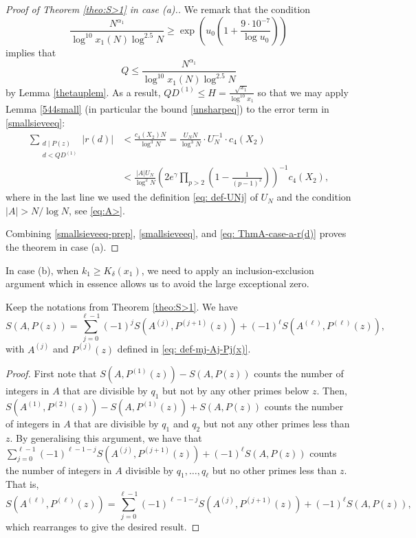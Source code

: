 \documentclass[12pt]{amsart}
\begin{document}
\begin{proof}[Proof of Theorem \ref{theo:S>1} in case (a).]
We remark that the condition 
\begin{equation*}
    \frac{N^{\alpha_1}}{\log^{10}x_1(N)\log^{2.5}N}\ge\exp\left(u_0\left(1+\frac{9\cdot 10^{-7}}{\log u_0}\right)\right)
\end{equation*}
implies that
\begin{equation}\label{qeq}
    Q\le \frac{N^{\alpha_1}}{\log^{10}x_1(N)\log^{2.5}N}
\end{equation}
by Lemma \ref{thetauplem}. As a result, $QD^{(1)}\le H=\frac{\sqrt{x_1}}{\log^{10}x_1}$ so that we may apply Lemma \ref{544small} (in particular the bound \eqref{unsharpeq}) to the error term in \eqref{smallsieveeq}:
\begin{align}
    \sum_{\substack{d\mid P(z)\\ d<QD^{(1)}}}|r(d)| &< \frac{c_4(X_2) N}{\log^3 N} = \frac{U_N N}{\log^3 N} \cdot U_N^{-1} \cdot c_4(X_2) \nonumber\\
    &< \frac{|A| U_N}{\log^2 N} \left(2e^{\gamma}\prod_{p>2}\left(1-\frac{1}{(p-1)^2}\right)\right)^{-1} c_4(X_2), \label{eq: ThmA-case-a-r(d)}
\end{align}
where in the last line we used the definition \eqref{eq: def-UNj} of $U_N$ and the condition $|A|>N/\log N$, see \eqref{eq:A>}. 

Combining \eqref{smallsieveeq-prep}, \eqref{smallsieveeq}, and \eqref{eq: ThmA-case-a-r(d)} proves the theorem in case (a).
\end{proof}

In case (b), when $k_1\ge K_{\delta}(x_1)$, we need to apply an inclusion-exclusion argument which in essence allows us to avoid the large exceptional zero.

\begin{lemma}\label{exinclem}
Keep the notations from Theorem \ref{theo:S>1}. We have
    \begin{equation*}
        S(A,P(z))=\sum_{j=0}^{\ell-1}(-1)^j S(A^{(j)},P^{(j+1)}(z))+(-1)^{\ell} S(A^{(\ell)},P^{(\ell)}(z)),
    \end{equation*}
    with $A^{(j)}$ and $P^{(j)}(z)$ defined in \eqref{eq: def-mj-Aj-Pj(x)}.
\end{lemma}
\begin{proof}
    First note that $S(A,P^{(1)}(z))-S(A,P(z))$ counts the number of integers in $A$ that are divisible by $q_1$ but not by any other primes below $z$. Then, $S(A^{(1)},P^{(2)}(z))-S(A,P^{(1)}(z))+S(A,P(z))$ counts the number of integers in $A$ that are divisible by $q_1$ and $q_2$ but not any other primes less than $z$. By generalising this argument, we have that $\sum_{j=0}^{\ell-1}(-1)^{\ell-1-j}S(A^{(j)},P^{(j+1)}(z))+(-1)^{\ell}S(A,P(z))$ counts the number of integers in $A$ divisible by $q_1,\ldots,q_{\ell}$ but no other primes less than $z$. That is,
    \begin{equation*}
        S(A^{(\ell)},P^{(\ell)}(z))=\sum_{j=0}^{\ell-1}(-1)^{\ell-1-j}S(A^{(j)},P^{(j+1)}(z))+(-1)^{\ell}S(A,P(z)),
    \end{equation*}
    which rearranges to give the desired result.
\end{proof}
\end{document}
